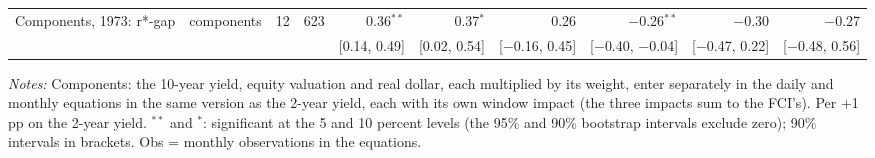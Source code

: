 \begin{table}[tp]
{\begin{tabular}{llcrrrrrrr}
\addlinespace
Components, 1973: r*-gap & components & 12 & 623 & 0.36$^{**}$ & 0.37$^{*}$ & 0.26 & $-$0.26$^{**}$ & $-$0.30 & $-$0.27\\
 & & & & {\scriptsize [0.14, 0.49]} & {\scriptsize [0.02, 0.54]} & {\scriptsize [$-$0.16, 0.45]} & {\scriptsize [$-$0.40, $-$0.04]} & {\scriptsize [$-$0.47, 0.22]} & {\scriptsize [$-$0.48, 0.56]}\\
\bottomrule\end{tabular}}
\begin{flushleft}\footnotesize\textit{Notes:} Components: the 10-year yield, equity valuation and real dollar, each multiplied by its weight, enter separately in the daily and monthly equations in the same version as the 2-year yield, each with its own window impact (the three impacts sum to the FCI's). Per +1 pp on the 2-year yield. $^{**}$ and $^{*}$: significant at the 5 and 10 percent levels (the 95\% and 90\% bootstrap intervals exclude zero); 90\% intervals in brackets. Obs = monthly observations in the equations.\end{flushleft}
\end{table}
